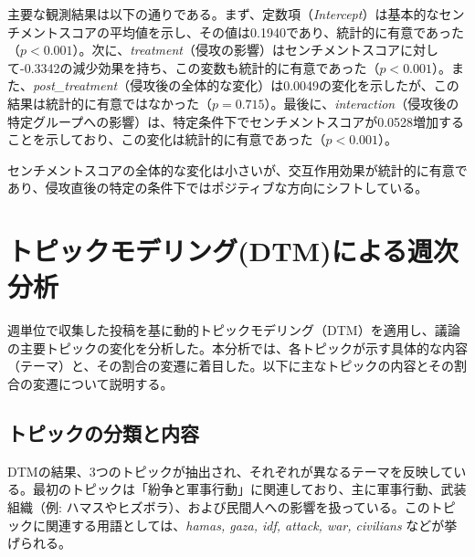 \documentclass[11pt, a4j]{jreport}
\begin{document}
    \begin{table}[H]
    \centering
    \caption{センチメントスコアの変化に関するWLS回帰結果}
    \label{tab:wls_results}
    \end{table}

    主要な観測結果は以下の通りである。まず、定数項（\textit{Intercept}）は基本的なセンチメントスコアの平均値を示し、その値は0.1940であり、統計的に有意であった（$p < 0.001$）。次に、\textit{treatment}（侵攻の影響）はセンチメントスコアに対して-0.3342の減少効果を持ち、この変数も統計的に有意であった（$p < 0.001$）。また、\textit{post\_treatment}（侵攻後の全体的な変化）は0.0049の変化を示したが、この結果は統計的に有意ではなかった（$p = 0.715$）。最後に、\textit{interaction}（侵攻後の特定グループへの影響）は、特定条件下でセンチメントスコアが0.0528増加することを示しており、この変化は統計的に有意であった（$p < 0.001$）。
    
    センチメントスコアの全体的な変化は小さいが、交互作用効果が統計的に有意であり、侵攻直後の特定の条件下ではポジティブな方向にシフトしている。

    \section{トピックモデリング(DTM)による週次分析}

    週単位で収集した投稿を基に動的トピックモデリング（DTM）を適用し、議論の主要トピックの変化を分析した。本分析では、各トピックが示す具体的な内容（テーマ）と、その割合の変遷に着目した。以下に主なトピックの内容とその割合の変遷について説明する。

    \subsection{トピックの分類と内容}
    DTMの結果、3つのトピックが抽出され、それぞれが異なるテーマを反映している。最初のトピックは「紛争と軍事行動」に関連しており、主に軍事行動、武装組織（例: ハマスやヒズボラ）、および民間人への影響を扱っている。このトピックに関連する用語としては、\textit{hamas, gaza, idf, attack, war, civilians} などが挙げられる。
    
\end{document}
